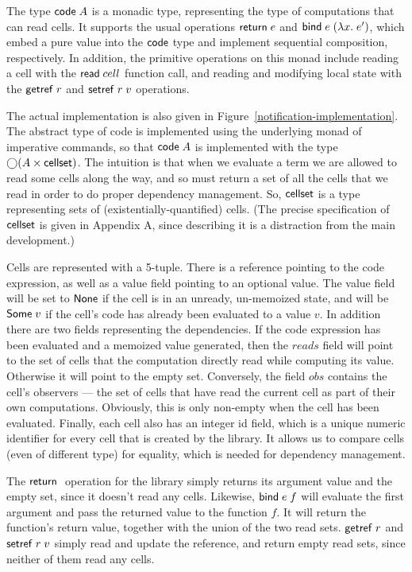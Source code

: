 The type $\mathsf{code}\;{A}$ is a monadic type, representing the type of
computations that can read cells. It supports the usual operations
$\mathsf{return}\; e$ and $\mathsf{bind}\; e\; (\lambda x.\;e')$, which embed a pure value
into the $\mathsf{code}$ type and implement sequential composition,
respectively. In addition, the primitive operations on this monad 
include reading a cell with the $\mathsf{read}\; cell$ function call, and 
reading and modifying local state with the $\mathsf{getref}\; r$ and $\mathsf{setref}\; r\;v$
operations. 
 
The actual implementation is also given in
Figure~\ref{notification-implementation}. The abstract type of code is
implemented using the underlying monad of imperative commands, so that
$\mathsf{code}\;{A}$ is implemented with the type $\bigcirc{(A \times
  \mathsf{cellset})}$.  The intuition is that when we evaluate a term we are
allowed to read some cells along the way, and so must return a set of
all the cells that we read in order to do proper dependency
management. So, $\mathsf{cellset}$ is a type representing sets of
(existentially-quantified) cells.  (The precise specification of
$\mathsf{cellset}$ is given in Appendix A, since describing it is a
distraction from the main development.)

Cells are represented with a 5-tuple. There is a reference pointing to
the code expression, as well as a value field pointing to an optional
value. The value field will be set to $\mathsf{None}$ if the cell is in
an unready, un-memoized state, and will be $\mathsf{Some}\;v$ if the
cell's code has already been evaluated to a value $v$. In addition there are
two fields representing the dependencies. If the code expression has
been evaluated and a memoized value generated, then the $reads$ field
will point to the set of cells that the computation directly read
while computing its value. Otherwise it will point to the empty
set. Conversely, the field $obs$ contains the cell's observers --- the
set of cells that have read the current cell as part of their own
computations. Obviously, this is only non-empty when the cell has been
evaluated. Finally, each cell also has an integer id field, which is a
unique numeric identifier for every cell that is created by the
library. It allows us to compare cells (even of different type) for
equality, which is needed for dependency management.

The $\mathsf{return}\;$ operation for the library simply returns its argument
value and the empty set, since it doesn't read any cells. Likewise,
$\mathsf{bind}\; e\;f$ will evaluate the first argument and pass the returned
value to the function $f$. It will return the function's return value,
together with the union of the two read sets. $\mathsf{getref}\; r$ and $\mathsf{setref}\; r\;v$
simply read and update the reference, and return empty read sets, since
neither of them read any cells. 


